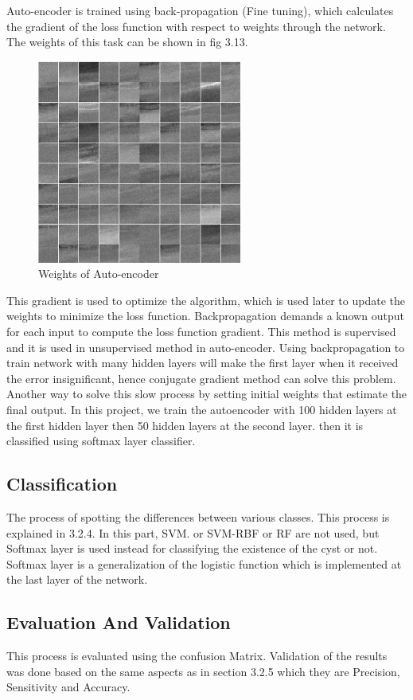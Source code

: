 Auto-encoder is trained using back-propagation (Fine tuning), which calculates the gradient of the loss function with respect to weights through the network.
The weights of this task can be shown in fig 3.13.

\begin{figure}[htb]
        \centering
        \includegraphics[width = 0.6\textwidth, height = 0.4\textheight]{figures/weightsautoencoder1.jpg} %
  \caption{Weights of Auto-encoder}
  \label{fig:Segmentation Pipeline}
\end{figure}
This gradient is used to optimize the algorithm, which is used later to update the weights to minimize the loss function\cite{liou2014autoencoder}.
Backpropagation demands a known output for each input to compute the loss function gradient. 
This method is supervised and it is used in unsupervised method in auto-encoder.
Using backpropagation to train network with many hidden layers will make the first layer when it received the error insignificant, hence conjugate gradient method can solve this problem.
Another way to solve this slow process by setting initial weights that estimate the final output.
In this project, we train the autoencoder with 100 hidden layers at the first hidden layer then 50 hidden layers at the second layer. then it is classified using softmax layer classifier.

\subsection{Classification} 
The process of spotting the differences between various classes.
This process is explained in 3.2.4. 
In this part, SVM. or SVM-RBF or RF are not used, but Softmax layer is used instead for classifying the existence of the cyst or not.
Softmax layer is a generalization of the logistic function which is implemented at the last layer of the network.
\subsection{Evaluation And Validation}
This process is evaluated using the confusion Matrix.
Validation of the results was done based on the same aspects as in section 3.2.5 which they are Precision, Sensitivity and Accuracy.

 













